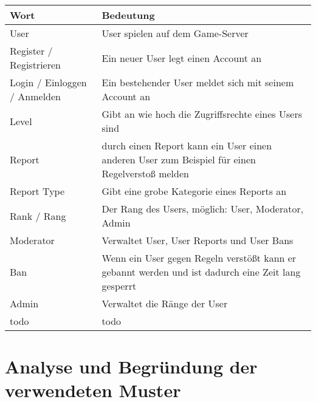 \begin{center}
    \begin{tabular}{ | l | l | }
        \hline
        Wort                         & Bedeutung                                                                                          \\ \hline
        User                         & User spielen auf dem Game-Server                                                                   \\
        Register / Registrieren      & Ein neuer User legt einen Account an                                                               \\ \hline
        Login / Einloggen / Anmelden & Ein bestehender User meldet sich mit seinem Account an                                             \\ \hline
        Level                        & Gibt an wie hoch die Zugriffsrechte eines Users sind                                               \\ \hline
        Report                       & durch einen Report kann ein User einen anderen User zum Beispiel für einen Regelverstoß melden     \\ \hline
        Report Type                  & Gibt eine grobe Kategorie eines Reports an                                                         \\ \hline
        Rank / Rang                  & Der Rang des Users, möglich: User, Moderator, Admin                                                \\ \hline
        Moderator                    & Verwaltet User, User Reports und User Bans                                                         \\ \hline
        Ban                          & Wenn ein User gegen Regeln verstößt kann er gebannt werden und ist dadurch eine Zeit lang gesperrt \\ \hline
        Admin                        & Verwaltet die Ränge der User                                                                       \\ \hline
        todo                         & todo                                                                                               \\ \hline
    \end{tabular}
\end{center}


\section{Analyse und Begründung der verwendeten Muster}

